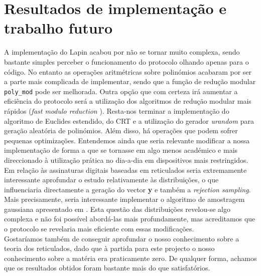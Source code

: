 \section{Resultados de implementação e trabalho futuro}
A implementação do Lapin acabou por não se tornar muito complexa, sendo bastante simples perceber o funcionamento do protocolo olhando apenas para o código. No entanto as operações aritmétricas sobre polinómios acabaram por ser a parte mais complicada de implementar, sendo que a função de redução modular \verb|poly_mod| pode ser melhorada. Outra opção que com certeza irá aumentar a eficiência do protocolo será a utilização dos algoritmos de redução modular mais rápidos (\textit{fast modulo reduction} \cite{Hankerson:2003:GEC:940321}). Resta-nos terminar a implementação do algoritmo de Euclides estendido, do CRT e a utilização do gerador \textit{urandom} para geração aleatória de polinómios. Além disso, há operações que podem sofrer pequenas optimizações. Entendemos ainda que seria relevante modificar a nossa implementação de forma a que se tornasse em algo menos académico e mais direccionado à utilização prática no dia-a-dia em dispositivos mais restringidos.\\
Em relação às assinaturas digitais baseadas em reticulados seria extremamente interessante aprofundar o estudo relativamente às distribuições, o que influenciaria directamente a geração do vector \textbf{y} e também a \textit{rejection sampling}. Mais precisamente, seria interessante implementar o algoritmo de amostragem gaussiana apresentado em \cite{galbraith2012efficient}. Esta questão das distribuições revelou-se algo complexa e não foi possível abordá-las mais profundamente, mas acreditamos que o protocolo se revelaria mais eficiente com essas modificações.\\ 
Gostaríamos também de conseguir aprofundar o nosso conhecimento sobre a teoria dos reticulados, dado que à partida para este projecto o nosso conhecimento sobre a matéria era praticamente zero. De qualquer forma, achamos que os resultados obtidos foram bastante mais do que satisfatórios.